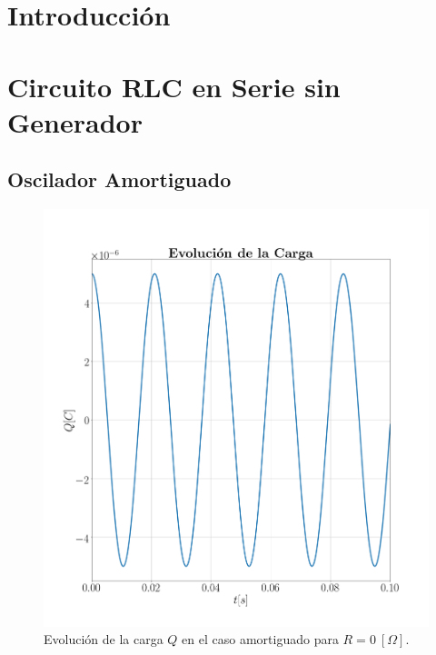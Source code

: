 \documentclass[journal]{IEEEtran}
\begin{document}
%
\IEEEpeerreviewmaketitle

\section{Introducción}


\section{Circuito RLC en Serie sin Generador}
\label{sec:rlcnogenerador}

\subsection{Oscilador Amortiguado}
\label{subsec:osciladoramortiguado}

\begin{figure}[!htb]
    \centering
    \includegraphics[width=\linewidth,trim={70 70 70 70},clip]{cargaamortiguado.png}
    \caption{Evolución de la carga $Q$ en el caso amortiguado para $R=0~[\Omega]$.}
    \label{fig:cargaamortiguado}
\end{figure}
\end{document}
